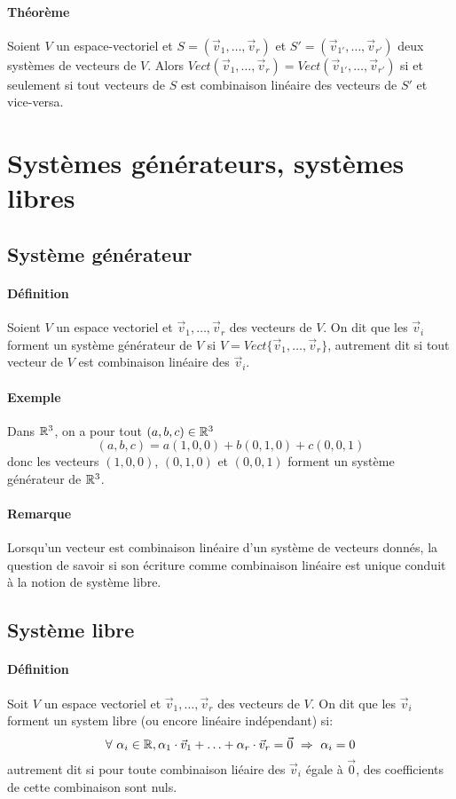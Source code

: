 \paragraph{Théorème} Soient $V$ un espace-vectoriel et $S = (\vec{v}_1, \ldots, \vec{v}_r)$ et $S' = (\vec{v}_{1'}, \ldots, \vec{v}_{r'})$ deux systèmes de vecteurs de $V$. Alors $Vect(\vec{v}_1, \ldots, \vec{v}_r) = Vect(\vec{v}_{1'}, \ldots, \vec{v}_{r'})$ si et seulement si tout vecteurs de $S$ est combinaison linéaire des vecteurs de $S'$ et vice-versa.

%
%
\section{Systèmes générateurs, systèmes libres}
%
%


%
\subsection{Système générateur}
%
\paragraph{Définition} Soient $V$ un espace vectoriel et $\vec{v}_1, \ldots, \vec{v}_r$ des vecteurs de $V$. On dit que les $\vec{v}_i$ forment un système générateur de $V$ si $V = Vect\{\vec{v}_1, \ldots, \vec{v}_r\}$, autrement dit si tout vecteur de $V$ est combinaison linéaire des $\vec{v}_i$.

\paragraph{Exemple} Dans $\mathbb{R}^3$, on a pour tout $(a,b,c) \in \mathbb{R}^3$ $$(a, b, c)=a(1,0,0)+b(0,1,0)+c(0,0,1)$$ donc les vecteurs $(1,0,0)$, $(0,1,0)$ et $(0,0,1)$ forment un système générateur de $\mathbb{R}^3$.

\paragraph{Remarque} Lorsqu'un vecteur est combinaison linéaire d'un système de vecteurs donnés, la question de savoir si son écriture comme combinaison linéaire est unique conduit à la notion de système libre.


%
\subsection{Système libre}
%
\paragraph{Définition} Soit $V$ un espace vectoriel et $\vec{v}_1, \ldots , \vec{v}_r$ des vecteurs de $V$. On dit que les $\vec{v}_i$ forment un system libre (ou encore linéaire indépendant) si:
$$\forall ~ \alpha_i \in \mathbb{R}, \alpha_1 \cdot \vec{v}_1 + \ldots + \alpha_r \cdot \vec{v}_r = \vec{0} ~ \Rightarrow ~ \alpha_i = 0$$
autrement dit si pour toute combinaison liéaire des $\vec{v}_i$ égale à $\vec{0}$, des coefficients de cette combinaison sont nuls.
